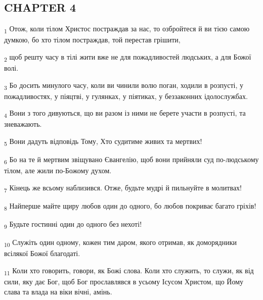 \subsection{CHAPTER 4}
\begin{tcolorbox}
\textsubscript{1} Отож, коли тілом Христос постраждав за нас, то озбройтеся й ви тією самою думкою, бо хто тілом постраждав, той перестав грішити,
\end{tcolorbox}
\begin{tcolorbox}
\textsubscript{2} щоб решту часу в тілі жити вже не для пожадливостей людських, а для Божої волі.
\end{tcolorbox}
\begin{tcolorbox}
\textsubscript{3} Бо досить минулого часу, коли ви чинили волю поган, ходили в розпусті, у пожадливостях, у піяцтві, у гулянках, у піятиках, у беззаконних ідолослужбах.
\end{tcolorbox}
\begin{tcolorbox}
\textsubscript{4} Вони з того дивуються, що ви разом із ними не берете участи в розпусті, та зневажають.
\end{tcolorbox}
\begin{tcolorbox}
\textsubscript{5} Вони дадуть відповідь Тому, Хто судитиме живих та мертвих!
\end{tcolorbox}
\begin{tcolorbox}
\textsubscript{6} Бо на те й мертвим звіщувано Євангелію, щоб вони прийняли суд по-людському тілом, але жили по-Божому духом.
\end{tcolorbox}
\begin{tcolorbox}
\textsubscript{7} Кінець же всьому наблизився. Отже, будьте мудрі й пильнуйте в молитвах!
\end{tcolorbox}
\begin{tcolorbox}
\textsubscript{8} Найперше майте щиру любов один до одного, бо любов покриває багато гріхів!
\end{tcolorbox}
\begin{tcolorbox}
\textsubscript{9} Будьте гостинні один до одного без нехоті!
\end{tcolorbox}
\begin{tcolorbox}
\textsubscript{10} Служіть один одному, кожен тим даром, якого отримав, як доморядники всілякої Божої благодаті.
\end{tcolorbox}
\begin{tcolorbox}
\textsubscript{11} Коли хто говорить, говори, як Божі слова. Коли хто служить, то служи, як від сили, яку дає Бог, щоб Бог прославлявся в усьому Ісусом Христом, що Йому слава та влада на віки вічні, амінь.
\end{tcolorbox}
